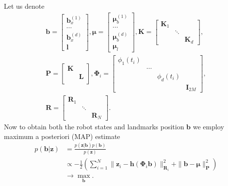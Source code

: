 Let us denote
\begin{gather}
    {\bm b} = \begin{bmatrix}
        {\bm b}_x^{(1)} \\
        \cdots \\
        {\bm b}_x^{(d)} \\
        {\bm l}
    \end{bmatrix},
    {\bm \mu} = \begin{bmatrix}
        {\bm \mu}_b^{(1)} \\
        \cdots \\
        {\bm \mu}_b^{(d)} \\
        {\bm \mu}_l
    \end{bmatrix},
    \mathbf{K} = \begin{bmatrix}
        \mathbf{K}_1 & & \\
        & \ddots & \\
        & & \mathbf{K}_d
    \end{bmatrix},
    \nonumber \\
    \mathbf{P} = \begin{bmatrix}
        \mathbf{K} & \\
        & \mathbf{L} \\
    \end{bmatrix},
    {\bm \Phi}_i = \begin{bmatrix}
        \phi_1(t_i) & & & \\
        & \cdots & & \\
        & & \phi_d(t_i) & \\
        & & & \mathbf{I}_{2M}
    \end{bmatrix},
    \label{eq:system_variables} \\
    \mathbf{R} = \begin{bmatrix}
        \mathbf{R}_1 & & \\
        & \ddots & \\
        & & \mathbf{R}_N
    \end{bmatrix}. \nonumber
\end{gather}
Now to obtain both the robot states and landmarks position
${\bm b}$ we employ maximum a posteriori (MAP) estimate
\begin{align}
\label{eq:map_equation}
    p({\bm b} | {\bm z}) &=
    \frac{p({\bm z} | {\bm b}) p({\bm b})}{p({\bm z})} \nonumber \\
    &\propto
    -\frac12 \left (
        \sum_{i=1}^N
        \|{\bm z_i} - {\bm h}({\bm \Phi}_i {\bm b})\|_{\mathbf{R}_i}^2
        + \|{\bm b} - {\bm \mu}\|_{\mathbf{P}}^2
    \right ) \nonumber \\
    & \rightarrow \max_{{\bm b}}.
\end{align}
